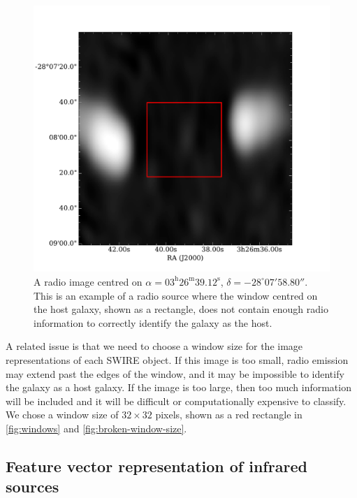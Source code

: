 \documentclass[fleqn,usenatbib,usedcolumn]{mnras}
\begin{document}
    \begin{figure}
      \centering
      \includegraphics[width=\linewidth]{images/ARG0003sky_radio}
      \caption{A radio image centred on $\alpha =
        03^\text{h}26^\text{m}39.12^\text{s}$, $\delta = -28^\circ{}07'58.80''$.        %
        This is an example of a radio source where the window centred on the
        host galaxy, shown as a rectangle, does not contain enough radio
        information to correctly identify the galaxy as the host.}
      \label{fig:broken-window-size}
    \end{figure}

    A related issue is that we need to choose a window size for the image
    representations of each SWIRE object. If this image is too small, radio
    emission may extend past the edges of the window, and it may be impossible
    to identify the galaxy as a host galaxy. If the image is too large, then
    too much information will be included and it will be difficult or
    computationally expensive to classify. We chose a window size of $32
    \times 32$ pixels, shown as a red rectangle in
    \autoref{fig:windows} and \autoref{fig:broken-window-size}.

  \subsection{Feature vector representation of infrared sources}
  \label{vector-representation-of-infrared-sources}
\end{document}
